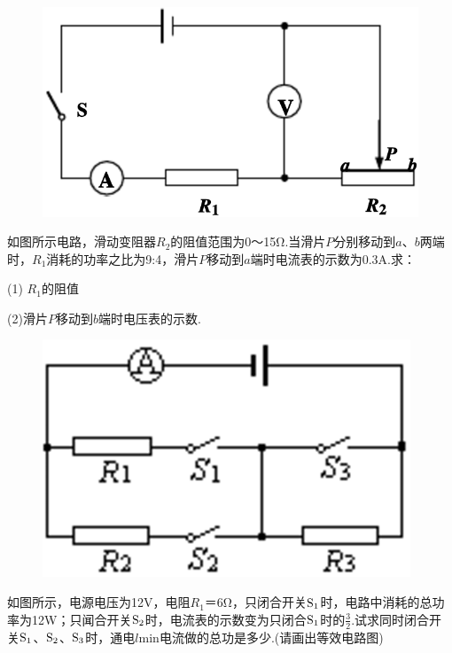\documentclass[11pt,a4paper]{article}
\newcommand{\nianfen}[1]{\hspace{-2em}{(#1\textbf{·}\textit{青岛})}}
\begin{document}
{	\begin{figure}
		\includegraphics[width=\linewidth]{2008}
	\end{figure}
	
	\nianfen{2008}如图所示电路，滑动变阻器$ R_2 $的阻值范围为0～15Ω.当滑片$ P $分别移动到$ a $、$ b $两端时，$ R_1 $消耗的功率之比为9:4，滑片$ P $移动到$ a $端时电流表的示数为0.3A.求：
	
	(1) $ R_1 $的阻值
	
	(2)滑片$ P $移动到$ b $端时电压表的示数.
	
	\rule{0em}{15em}
	
	\begin{figure}
		\includegraphics[width=\linewidth]{2007}
	\end{figure}

	\nianfen{2007}如图所示，电源电压为12V，电阻$ R_1 $＝6Ω，只闭合开关$\rm S_1 $时，电路中消耗的总功率为12W；只闻合开关$\rm S_2 $时，电流表的示数变为只闭合$\rm S_1 $时的$\frac{3}{2}$.试求同时闭合开关$\rm S_1 $、$\rm S_2 $、$\rm S_3 $时，通电$ l $min电流做的总功是多少.(请画出等效电路图)
	
}
\end{document}
